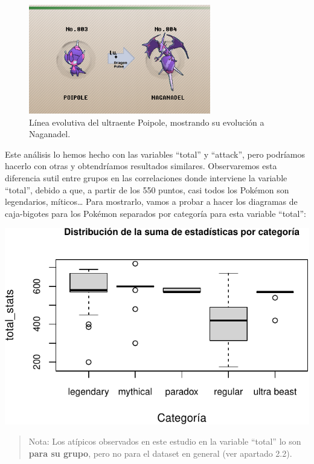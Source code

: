 \documentclass[
  11.8pt,
]{extreport}
\begin{document}
\begin{itemize}
\begin{figure}[H]
  {\centering \includegraphics[width=3.125in,height=\textheight]{trabajo_images/Naganadel.png}

  }

  \caption{Línea evolutiva del ultraente Poipole, mostrando su evolución
  a Naganadel.}

  \end{figure}%
\end{itemize}

Este análisis lo hemos hecho con las variables ``total'' y ``attack'',
pero podríamos hacerlo con otras y obtendríamos resultados similares.
Observaremos esta diferencia sutil entre grupos en las correlaciones
donde interviene la variable ``total'', debido a que, a partir de los
550 puntos, casi todos los Pokémon son legendarios, míticos\ldots{} Para
mostrarlo, vamos a probar a hacer los diagramas de caja-bigotes para los
Pokémon separados por categoría para esta variable ``total'':

\begin{center}
\includegraphics{trabajo_files/figure-pdf/unnamed-chunk-20-1.pdf}
\end{center}

\begin{quote}
Nota: Los atípicos observados en este estudio en la variable ``total''
lo son \textbf{para su grupo}, pero no para el dataset en general (ver
apartado 2.2).
\end{quote}
\end{document}
